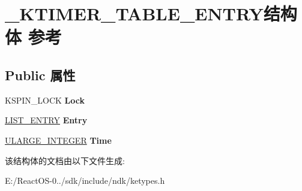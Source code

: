 \hypertarget{struct___k_t_i_m_e_r___t_a_b_l_e___e_n_t_r_y}{}\section{\+\_\+\+K\+T\+I\+M\+E\+R\+\_\+\+T\+A\+B\+L\+E\+\_\+\+E\+N\+T\+R\+Y结构体 参考}
\label{struct___k_t_i_m_e_r___t_a_b_l_e___e_n_t_r_y}
\subsection*{Public 属性}
\begin{DoxyCompactItemize}
\item 
\mbox{\label{struct___k_t_i_m_e_r___t_a_b_l_e___e_n_t_r_y_a9f2c3b94086c695606bc1b2fe70d611b}} 
K\+S\+P\+I\+N\+\_\+\+L\+O\+CK {\bfseries Lock}
\item 
\mbox{\label{struct___k_t_i_m_e_r___t_a_b_l_e___e_n_t_r_y_ac2fb667532d1fbe25abe5eff1abb657f}} 
\hyperlink{struct___l_i_s_t___e_n_t_r_y}{L\+I\+S\+T\+\_\+\+E\+N\+T\+RY} {\bfseries Entry}
\item 
\mbox{\label{struct___k_t_i_m_e_r___t_a_b_l_e___e_n_t_r_y_aaa021223b2e808e80768d789667f1985}} 
\hyperlink{struct___u_l_a_r_g_e___i_n_t_e_g_e_r}{U\+L\+A\+R\+G\+E\+\_\+\+I\+N\+T\+E\+G\+ER} {\bfseries Time}
\end{DoxyCompactItemize}


该结构体的文档由以下文件生成\+:\begin{DoxyCompactItemize}
\item 
E\+:/\+React\+O\+S-\/0../sdk/include/ndk/ketypes.\+h\end{DoxyCompactItemize}
